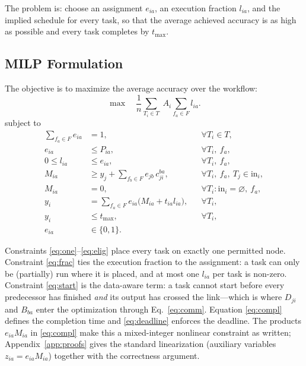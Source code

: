 \documentclass[conference]{IEEEtran}
\begin{document}
The problem is: choose an assignment $e_{ia}$, an execution fraction $l_{ia}$, and the implied schedule for every task, so that the average achieved accuracy is as high as possible and every task completes by $t_{\max}$.

\subsection{MILP Formulation}
\label{sec:milp}

The objective is to maximize the average accuracy over the workflow:
\begin{equation}
 \max \quad \frac{1}{n}\sum_{T_i\in T}\; A_i\sum_{f_a\in F} l_{ia}.
\label{eq:obj}
\end{equation}
subject to
\begin{align}
 \sum_{f_a\in F} e_{ia} &=1, && \forall T_i\in T, \label{eq:one}\\
 e_{ia} &\le P_{ia}, && \forall T_i,\ f_a, \label{eq:elig}\\
 0\le l_{ia} &\le e_{ia}, && \forall T_i,\ f_a, \label{eq:frac}\\
 M_{ia} &\ge y_j+\sum_{f_b\in F} e_{jb}\,c_{ji}^{ba}, && \forall T_i,\ f_a,\ T_j\in\mathrm{in}_i, \label{eq:start}\\
 M_{ia} &=0, && \forall T_i:\mathrm{in}_i=\varnothing,\ f_a, \label{eq:startsrc}\\
 y_i &=\sum_{f_a\in F} e_{ia}\bigl(M_{ia}+t_{ia}l_{ia}\bigr), && \forall T_i, \label{eq:compl}\\
 y_i &\le t_{\max}, && \forall T_i, \label{eq:deadline}\\
 e_{ia} &\in\{0,1\}. && \label{eq:bin}
\end{align}

Constraints \eqref{eq:one}--\eqref{eq:elig} place every task on exactly one permitted node. Constraint \eqref{eq:frac} ties the execution fraction to the assignment: a task can only be (partially) run where it is placed, and at most one $l_{ia}$ per task is non-zero. Constraint \eqref{eq:start} is the data-aware term: a task cannot start before every predecessor has finished \emph{and} its output has crossed the link---which is where $D_{ji}$ and $B_{ba}$ enter the optimization through Eq.~\eqref{eq:comm}. Equation \eqref{eq:compl} defines the completion time and \eqref{eq:deadline} enforces the deadline. The products $e_{ia}M_{ia}$ in \eqref{eq:compl} make this a mixed-integer nonlinear constraint as written; Appendix~\ref{app:proofs} gives the standard linearization (auxiliary variables $z_{ia}=e_{ia}M_{ia}$) together with the correctness argument.
\end{document}
